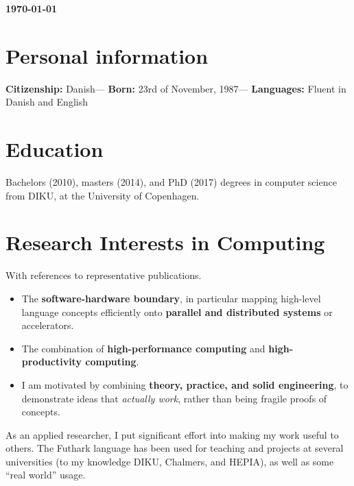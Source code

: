 \documentclass{resume} %
\author{Troels Henriksen}
\date{\today}
\begin{document}
\maketitle
\begin{center}
  \textbf{\today}
\end{center}
\section{Personal information}

\textbf{Citizenship:} Danish---
\textbf{Born:} 23rd of November, 1987---
\textbf{Languages:} Fluent in Danish and English

\section{Education}

Bachelors (2010), masters (2014), and PhD (2017) degrees in computer
science from DIKU, at the University of Copenhagen.

\section{Research Interests in Computing}

With references to representative publications.

\begin{itemize}
\item The \textbf{software-hardware boundary}, in particular mapping
  high-level language concepts efficiently onto \textbf{parallel and
    distributed systems} or
  accelerators. \cite{Henriksen:2017:FPF:3062341.3062354,Henriksen:2019:IFN:3293883.3295707,Larsen:2017:SRS:3122948.3122952,10.1145/2898354}
\item The combination of \textbf{high-performance computing} and
  \textbf{high-productivity computing}.~\cite{giesekemassively,lindh2019a,10.1145/3331553.3342617,Elsman:2019:DFE:3315454.3329955}
\item I am motivated by combining \textbf{theory, practice, and solid
    engineering}, to demonstrate ideas that \textit{actually work},
  rather than being fragile proofs of
  concepts.\cite{Henriksen:2017:FPF:3062341.3062354,Henriksen:2019:IFN:3293883.3295707,Elsman:2018:SIH:3243631.3236792,10.1007/978-3-030-18506-0_7}
\end{itemize}

As an applied researcher, I put significant effort into making my work
useful to others.  The Futhark language has been used for teaching and
projects at several universities (to my knowledge DIKU, Chalmers, and
HEPIA), as well as some ``real world'' usage.
\end{document}
